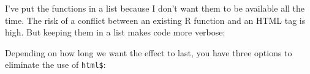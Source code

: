 \begin{Shaded}
\begin{Highlighting}[]
\StringTok{ }
    \NormalTok{(}\NormalTok{, }\NormalTok{)}
  \NormalTok{\}}
\NormalTok{\}}
\StringTok{ }\NormalTok{(}\NormalTok{, }\NormalTok{, }\NormalTok{)}
\StringTok{ }\NormalTok{(}
\end{Highlighting}
\end{Shaded}

I've put the functions in a list because I don't want them to be
available all the time. The risk of a conflict between an existing R
function and an HTML tag is high. But keeping them in a list makes code
more verbose:

\begin{Shaded}
\begin{Highlighting}[]
\NormalTok{(}\NormalTok{(}\NormalTok{), }\NormalTok{)}
\end{Highlighting}
\end{Shaded}

Depending on how long we want the effect to last, you have three options
to eliminate the use of \texttt{html\$}:

